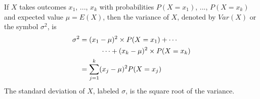 \begin{termBox}{
If $X$ takes outcomes $x_1$, ..., $x_k$ with probabilities $P(X=x_1)$, ..., $P(X=x_k)$ and expected value $\mu=E(X)$, then the variance of $X$, denoted by $Var(X)$ or the symbol $\sigma^2$, is
\begin{align}
\sigma^2 &= (x_1-\mu)^2\times P(X=x_1) + \cdots \notag \\
	& \qquad\quad\cdots+ (x_k-\mu)^2\times P(X=x_k) \notag \\
	&= \sum_{j=1}^{k} (x_j - \mu)^2 P(X=x_j)
\end{align}
The standard deviation of $X$, labeled $\sigma$, is the square root of the variance.}
\end{termBox}

